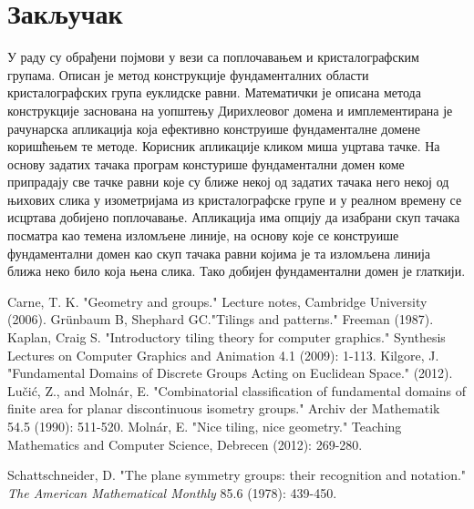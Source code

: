 \documentclass[12pt]{report}
\begin{document}
\chapter {Закључак}
У раду су обрађени појмови у вези са поплочавањем и кристалографским групама. Описан је метод конструкције фундаменталних области кристалографских група еуклидске равни. Математички је описана метода конструкције заснована на уопштењу Дирихлеовог домена и имплементирана је рачунарска апликација која ефективно конструише фундаменталне домене коришћењем те методе. Корисник апликације кликом миша уцртава тачке. На основу задатих тачака програм констурише фундаментални домен коме припрадају све тачке равни које су ближе некој од задатих тачака него некој од њихових слика у изометријама из кристалографске групе и у реалном времену се исцртава добијено поплочавање. Апликација има опцију да изабрани скуп тачака посматра као темена изломљене линије, на основу које се конструише фундаментални домен као скуп тачака равни којима је та изломљена линија ближа неко било која њена слика. Тако добијен фундаментални домен је глаткији. 




\renewcommand\bibname{Литература}
\begin{thebibliography}{}

  Carne, T. K.  "Geometry and groups." Lecture notes, Cambridge University (2006). 
Grünbaum B, Shephard GC."Tilings and patterns." Freeman (1987).
   Kaplan, Craig S. "Introductory tiling theory for computer graphics."{} Synthesis Lectures on Computer Graphics and Animation 4.1 (2009): 1-113. 
   Kilgore, J. "Fundamental Domains of Discrete Groups Acting on Euclidean Space." (2012). 
  Lučić, Z., and Molnár, E. "{}Combinatorial classification of fundamental domains of finite area for planar discontinuous isometry groups." Archiv der Mathematik 54.5 (1990): 511-520.
 Molnár, E. "Nice tiling, nice geometry." Teaching Mathematics and Computer Science, Debrecen (2012): 269-280.


  Schattschneider, D. "The plane symmetry groups: their recognition
  and notation." \emph{The American Mathematical Monthly} 85.6 (1978):
  439-450.



\end{thebibliography}





	
\end{document}
